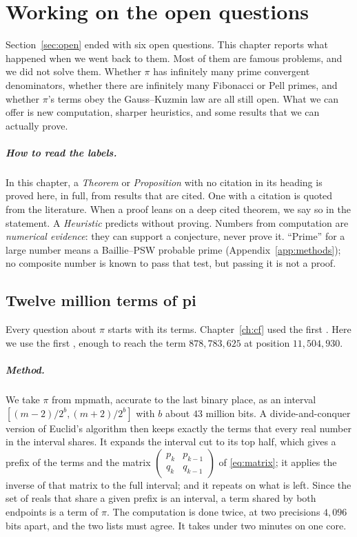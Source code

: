 \chapter{Working on the open questions}\label{ch:openq}
\addednote{\revA}

Section~\ref{sec:open} ended with six open questions. This chapter reports what happened when we went back to them. Most of them are famous problems, and we did not solve them. Whether $\pi$ has infinitely many prime convergent denominators, whether there are infinitely many Fibonacci or Pell primes, and whether $\pi$'s terms obey the Gauss--Kuzmin law are all still open. What we can offer is new computation, sharper heuristics, and some results that we can actually prove.

\paragraph{How to read the labels.} In this chapter, a \emph{Theorem} or \emph{Proposition} with no citation in its heading is proved here, in full, from results that are cited. One with a citation is quoted from the literature. When a proof leans on a deep cited theorem, we say so in the statement. A \emph{Heuristic} predicts without proving. Numbers from computation are \emph{numerical evidence}: they can support a conjecture, never prove it. ``Prime'' for a large number means a Baillie--PSW probable prime (Appendix~\ref{app:methods}); no composite number is known to pass that test, but passing it is not a proof.

\section{Twelve million terms of pi}\label{sec:twelve}

Every question about $\pi$ starts with its terms. Chapter~\ref{ch:cf} used the first \NT{}. Here we use the first \OqNT, enough to reach the term $878{,}783{,}625$ at position $11{,}504{,}930$.

\paragraph{Method.} We take $\pi$ from mpmath, accurate to the last binary place, as an interval $[(m-2)/2^b, (m+2)/2^b]$ with $b$ about $43$ million bits. A divide-and-conquer version of Euclid's algorithm then keeps exactly the terms that every real number in the interval shares. It expands the interval cut to its top half, which gives a prefix of the terms and the matrix $\left(\begin{smallmatrix}p_k & p_{k-1}\\ q_k & q_{k-1}\end{smallmatrix}\right)$ of \eqref{eq:matrix}; it applies the inverse of that matrix to the full interval; and it repeats on what is left. Since the set of reals that share a given prefix is an interval, a term shared by both endpoints is a term of $\pi$. The computation is done twice, at two precisions $4{,}096$ bits apart, and the two lists must agree. It takes under two minutes on one core.

